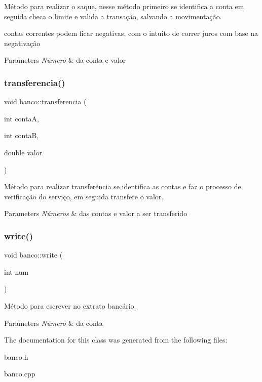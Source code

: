 Método para realizar o saque, nesse método primeiro se identifica a conta em seguida checa o limite e valida a transação, salvando a movimentação. 

contas correntes podem ficar negativas, com o intuito de correr juros com base na negativação 
\begin{DoxyParams}{Parameters}
{\em Número} & da conta e valor \\
\hline
\end{DoxyParams}
\mbox{\label{classbanco_a81638b3957b2c422e58df4ace22d0d55}} 
\subsubsection{\texorpdfstring{transferencia()}{transferencia()}}
{\footnotesize\ttfamily void banco\+::transferencia (\begin{DoxyParamCaption}\item[{int}]{contaA,  }\item[{int}]{contaB,  }\item[{double}]{valor }\end{DoxyParamCaption})}



Método para realizar transferência se identifica as contas e faz o processo de verificação do serviço, em seguida transfere o valor. 


\begin{DoxyParams}{Parameters}
{\em Números} & das contas e valor a ser transferido \\
\hline
\end{DoxyParams}
\mbox{\label{classbanco_ac2ca2d3e9a02bf099e3b1deb5303c2ce}} 
\subsubsection{\texorpdfstring{write()}{write()}}
{\footnotesize\ttfamily void banco\+::write (\begin{DoxyParamCaption}\item[{int}]{num }\end{DoxyParamCaption})}



Método para escrever no extrato bancário. 


\begin{DoxyParams}{Parameters}
{\em Número} & da conta \\
\hline
\end{DoxyParams}


The documentation for this class was generated from the following files\+:\begin{DoxyCompactItemize}
\item 
banco.\+h\item 
banco.\+cpp\end{DoxyCompactItemize}
